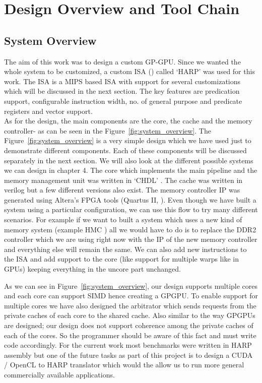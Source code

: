 \setcounter{equation}{0}

\chapter{Design Overview and Tool Chain}
\label{chap: Design Overview and Tool Chain}

\section{ System Overview }
The aim of this work was to design a custom GP-GPU. Since we wanted the whole system to be customized, a custom ISA (\cite{schreier}) called `HARP' was used for this work. The ISA is a MIPS based ISA with support for several customizations which will be discussed in the next section. The key features are predication support, configurable instruction width, no. of general purpose and predicate registers and vector support. 
\\
As for the design, the main components are the core, the cache and the memory controller- as can be seen in the Figure~\ref{fig:system_overview}. The Figure~\ref{fig:system_overview} is a very simple design which we have used just to demonstrate different components. Each of these components will be discussed separately in the next section. We will also look at the different possible systems we can design in chapter 4. The core which implements the main pipeline and the memory management unit was written in `CHDL' \cite{schreier}. The cache was written in verilog but a few different versions also exist. The memory controller IP was generated using Altera's FPGA tools (Quartus II, \cite{schreier}). Even though we have built a system using a particular configuration, we can use this flow to try many different scenarios. For example if we want to built a system which uses a new kind of memory system (example HMC \cite{schreier} ) all we would have to do is to replace the DDR2 controller which we are using right now with the IP of the new memory controller and everything else will remain the same. We can also add new instructions to the ISA and add support to the core (like support for multiple warps like in GPUs) keeping everything in the uncore part unchanged. 
\\

As we can see in Figure~\ref{fig:system_overview}, our design supports multiple cores and each core can support SIMD hence creating a GPGPU. To enable support for multiple cores we have also designed the arbitrator which sends requests from the private caches of each core to the shared cache. Also similar to the way GPGPUs are designed; our design does not support coherence among the private caches of each of the cores. So the programmer should be aware of this fact and must write code accordingly. For the current work most benchmarks were written in HARP assembly but one of the future tasks as part of this project is to design a CUDA / OpenCL to HARP translator which would the allow us to run more general commercially available applications.
